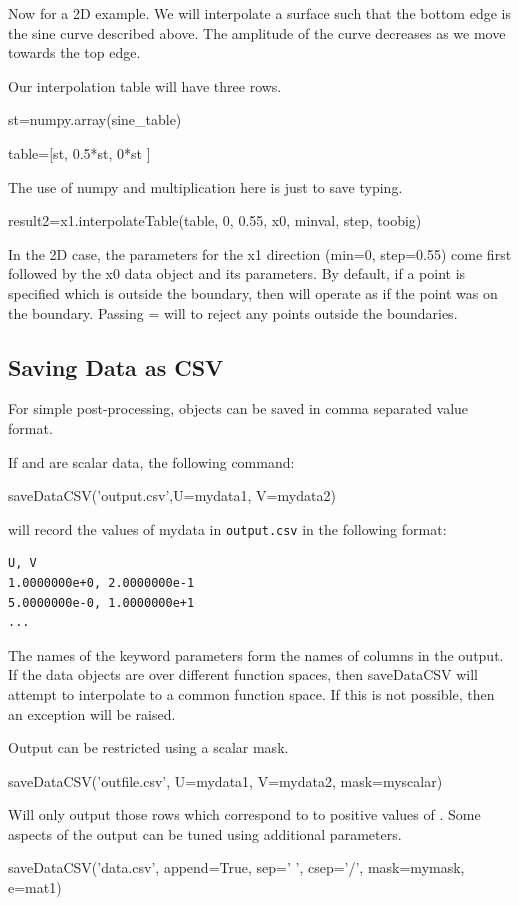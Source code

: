 Now for a 2D example.
We will interpolate a surface such that the bottom edge is the sine curve described above.
The amplitude of the curve decreases as we move towards the top edge.

Our interpolation table will have three rows.
\begin{python}
st=numpy.array(sine_table)

table=[st, 0.5*st, 0*st ]
\end{python}

The use of numpy and multiplication here is just to save typing.

\begin{python}
result2=x1.interpolateTable(table, 0, 0.55, x0, minval, step, toobig)
\end{python}

In the 2D case, the parameters for the x1 direction (min=0, step=0.55) come first followed by the x0 data object and 
its parameters.
By default, if a point is specified which is outside the boundary, then  will operate
as if the point was on the boundary.
Passing = will  to reject any points outside the boundaries.

\subsection{Saving Data as CSV}
For simple post-processing, \Data objects can be saved in comma separated value format.

If  and  are scalar data, the following command:
\begin{python}
saveDataCSV('output.csv',U=mydata1, V=mydata2)
\end{python}
will record the values of mydata in \texttt{output.csv} in the following format:
\begin{verbatim}
U, V
1.0000000e+0, 2.0000000e-1
5.0000000e-0, 1.0000000e+1
...
\end{verbatim}

The names of the keyword parameters form the names of columns in the output.
If the data objects are over different function spaces, then saveDataCSV will attempt to
interpolate to a common function space.
If this is not possible, then an exception will be raised.

Output can be restricted using a scalar mask.
\begin{python}
saveDataCSV('outfile.csv', U=mydata1, V=mydata2, mask=myscalar)
\end{python}
Will only output those rows which correspond to to positive values of .
Some aspects of the output can be tuned using additional parameters.
\begin{python}
saveDataCSV('data.csv', append=True, sep=' ', csep='/', mask=mymask, e=mat1)
\end{python}

